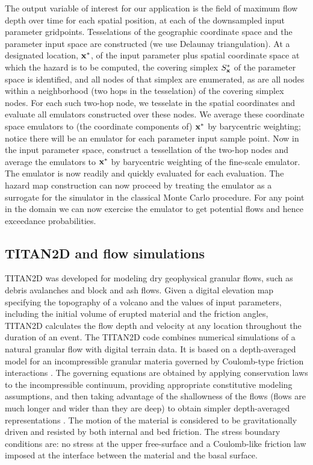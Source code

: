\documentclass[12pt]{article}
\begin{document}
The output variable of interest for our application is the field of
maximum flow depth over time for each spatial position, at each of the
downsampled input parameter gridpoints.  Tesselations of the
geographic coordinate space and the parameter input space are
constructed (we use Delaunay triangulation).  At a designated
location, ${\bf x}^*$, of the input parameter plus spatial coordinate
space at which the hazard is to be computed, the covering simplex
$S_{\bf x}^* $ of the parameter space is identified, and all nodes of
that simplex are enumerated, as are all nodes within a neighborhood
(two hops in the tesselation) of the covering simplex nodes.  For each
such two-hop node, we tesselate in the spatial coordinates and
evaluate all emulators constructed over these nodes.  We average these
coordinate space emulators to (the coordinate components of) ${\bf
  x}^*$ by barycentric weighting; notice there will be an emulator for
each parameter input sample point. Now in the input parameter space,
construct a tessellation of the two-hop nodes and average the
emulators to ${\bf x}^*$ by barycentric weighting of the fine-scale
emulator.  The emulator is now readily and quickly evaluated for each
evaluation. The hazard map construction can now proceed by treating
the emulator as a surrogate for the simulator in the classical Monte
Carlo procedure.  For any point in the domain we can now exercise the
emulator to get potential flows and hence exceedance probabilities.


\subsection{TITAN2D and flow simulations}

TITAN2D was developed for modeling dry geophysical granular flows,
such as debris avalanches and block and ash flows.  Given a digital
elevation map specifying the topography of a volcano and the values of
input parameters, including the initial volume of erupted material and
the friction angles, TITAN2D calculates the flow depth and velocity at
any location throughout the duration of an event.  The TITAN2D code
combines numerical simulations of a natural granular flow with digital
terrain data. It is based on a depth-averaged model for an
incompressible granular materia governed by Coulomb-type friction
interactions \citep{Savage1989}.  The governing equations are obtained
by applying conservation laws to the incompressible continuum,
providing appropriate constitutive modeling assumptions, and then
taking advantage of the shallowness of the flows (flows are much
longer and wider than they are deep) to obtain simpler depth-averaged
representations \citep{Patra2005}. The motion of the material is
considered to be gravitationally driven and resisted by both internal
and bed friction. The stress boundary conditions are: no stress at the
upper free-surface and a Coulomb-like friction law imposed at the
interface between the material and the basal surface.
\end{document}

